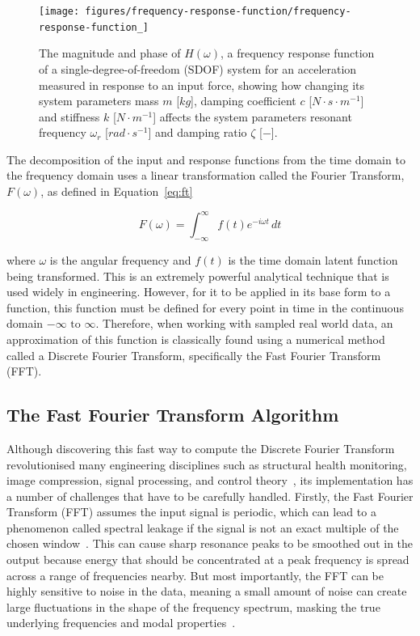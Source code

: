 \documentclass[12pt]{article}
\begin{document}
    \begin{figure}[ht]
        \centering
        \texttt{[image: figures/frequency-response-function/frequency-response-function\_]}
        \caption{The magnitude and phase of $H(\omega)$, a frequency response function of a single-degree-of-freedom (SDOF) system for an acceleration measured in response to an input force, showing how changing its system parameters mass $m$ [$kg$], damping coefficient $c$ [$N \cdot s \cdot m^{-1}$] and stiffness $k$ [$N \cdot m^{-1}$] affects the system parameters resonant frequency $\omega_r$ [$rad \cdot s^{-1}$] and damping ratio $\zeta$ [$-$].}
        \label{fig:frequency-response-function}
    \end{figure}

    The decomposition of the input and response functions from the time domain to the frequency domain uses a linear transformation called the Fourier Transform, $F(\omega)$, as defined in Equation~\ref{eq:ft}

    \begin{equation}
        F(\omega) = \int_{-\infty}^{\infty} f(t) e^{-i \omega t} \, dt\label{eq:ft}
    \end{equation}


    \noindent where $\omega$ is the angular frequency and $f(t)$ is the time domain latent function being transformed.
    This is an extremely powerful analytical technique that is used widely in engineering.
    However, for it to be applied in its base form to a function, this function must be defined for every point in time in the continuous domain $-\infty \text{ to } \infty$.
    Therefore, when working with sampled real world data, an approximation of this function is classically found using a numerical method called a Discrete Fourier Transform, specifically the Fast Fourier Transform (FFT).

    \subsection{The Fast Fourier Transform Algorithm}
    Although discovering this fast way to compute the Discrete Fourier Transform revolutionised many engineering disciplines such as structural health monitoring, image compression, signal processing, and control theory~\cite{Byjus2023}, its implementation has a number of challenges that have to be carefully handled.
    Firstly, the Fast Fourier Transform (FFT) assumes the input signal is periodic, which can lead to a phenomenon called spectral leakage if the signal is not an exact multiple of the chosen window~\cite{MathStackExchange2023}.
    This can cause sharp resonance peaks to be smoothed out in the output because energy that should be concentrated at a peak frequency is spread across a range of frequencies nearby.
    But most importantly, the FFT can be highly sensitive to noise in the data, meaning a small amount of noise can create large fluctuations in the shape of the frequency spectrum, masking the true underlying frequencies and modal properties~\cite{MathStackExchange2023}.
\end{document}
